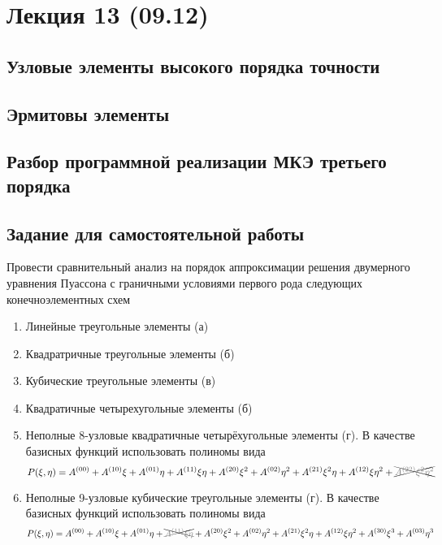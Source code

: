 \section{Лекция 13 (09.12)}

\subsection{Узловые элементы высокого порядка точности}
\subsection{Эрмитовы элементы}
\subsection{Разбор программной реализации МКЭ третьего порядка}
\subsection{Задание для самостоятельной работы}
Провести сравнительный анализ на порядок аппроксимации решения двумерного
уравнения Пуассона с граничными условиями первого рода
следующих конечноэлементных схем
\begin{enumerate}
\item
Линейные треугольные элементы (а)
\item
Квадратричные треугольные элементы (б)
\item
Кубические треугольные элементы (в)
\item
Квадратичные четырехугольные элементы (б)
\item
Неполные 8-узловые квадратичные четырёхугольные элементы (г). В качестве базисных функций использовать полиномы вида
$$
P(\xi, \eta) =
  A^{(00)}
+ A^{(10)}\xi
+ A^{(01)}\eta
+ A^{(11)}\xi\eta
+ A^{(20)} \xi^2
+ A^{(02)}\eta^2
+ A^{(21)}\xi^2\eta
+ A^{(12)}\xi\eta^2
+ \xcancel{\color{gray} A^{(22)}\xi^2 \eta^2}
$$
\item
Неполные 9-узловые кубические треугольные элементы (г). В качестве базисных функций использовать полиномы вида
$$
P(\xi, \eta) =
  A^{(00)}
+ A^{(10)}\xi
+ A^{(01)}\eta
+ \xcancel{\color{gray} A^{(11)}\xi\eta}
+ A^{(20)}\xi^2
+ A^{(02)}\eta^2
+ A^{(21)}\xi^2\eta
+ A^{(12)}\xi\eta^2
+ A^{(30)}\xi^3
+ A^{(03)}\eta^3
$$
\end{enumerate}

